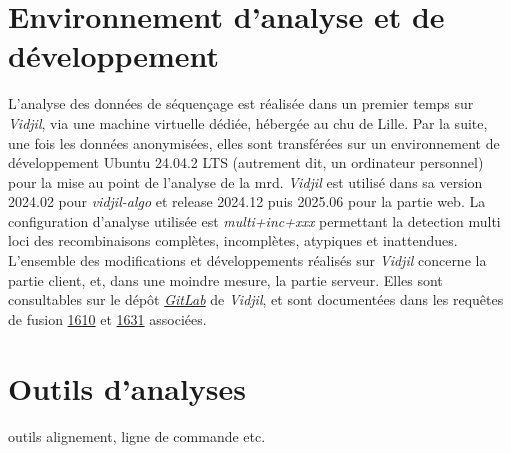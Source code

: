 \section{Environnement d'analyse et de développement}

L'analyse des données de séquençage est réalisée dans un premier temps sur \textit{Vidjil}, via une machine virtuelle dédiée,
hébergée au \gls{chu} de Lille. Par la suite, une fois les données anonymisées, elles sont transférées sur un environnement de 
développement Ubuntu 24.04.2 LTS (autrement dit, un ordinateur personnel) pour la mise au point de l'analyse de la \gls{mrd}.
\textit{Vidjil} est utilisé dans sa version 2024.02 pour \textit{vidjil-algo} et release 2024.12 puis 2025.06 pour la partie 
web. La configuration d'analyse utilisée est \textit{multi+inc+xxx} permettant la detection multi loci des recombinaisons complètes, 
incomplètes, atypiques et inattendues.
L'ensemble des modifications et développements réalisés sur \textit{Vidjil} concerne la partie client, et, dans une moindre mesure,
la partie serveur. Elles sont consultables sur le dépôt \href{https://gitlab.inria.fr/users/x-benha/activity}{\textit{GitLab}}
de \textit{Vidjil}, et sont documentées dans les requêtes de fusion \href{https://gitlab.inria.fr/vidjil/vidjil/-/merge_requests/1610}{1610}
et \href{https://gitlab.inria.fr/vidjil/vidjil/-/merge_requests/1631}{1631} associées.

\section{Outils d'analyses}

outils alignement, ligne de commande etc.


